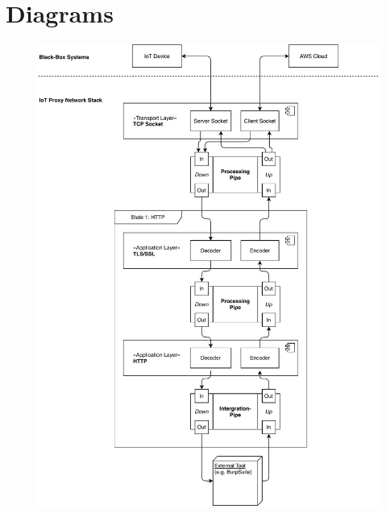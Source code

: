 \chapter{Diagrams}


\begin{figure}[t]
    \centering
    \includegraphics[width=14cm]{img/ch04/Architecture - PipesFilters 1.pdf}
    \label{fig:app-diag-pipesfilters-1}
\end{figure}

